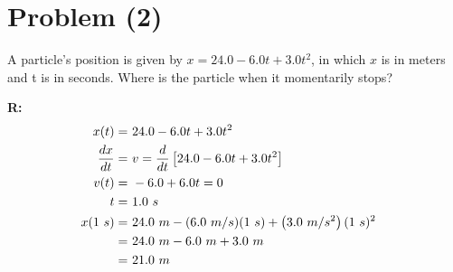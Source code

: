 \section{Problem (2)}
	A particle's position is given by $x = 24.0 - 6.0t + 3.0t^{2}$, in which $x$ is in meters and t is in seconds. Where is the particle when it momentarily stops?

	\textbf{R:} \newline
	\begin{align}
		x(t) = \ &24.0 - 6.0t + 3.0t^{2}& \notag \\
		\frac{dx}{dt} = \ &v = \frac{d}{dt}\left[ 24.0 - 6.0t + 3.0t^{2} \right]& \notag \\
		v(t) = \ &- 6.0 + 6.0t = 0& \notag \\
		t = \ &1.0 \ s& \notag \\
		x(1 \ s) = \ &24.0 \ m - (6.0 \ m/s) (1 \ s) + \left( 3.0 \ m/s^{2} \right) (1 \ s)^{2}& \notag \\
		= \ &24.0 \ m - 6.0 \ m + 3.0 \ m& \notag \\
		= \ &21.0 \ m&
	\end{align}
